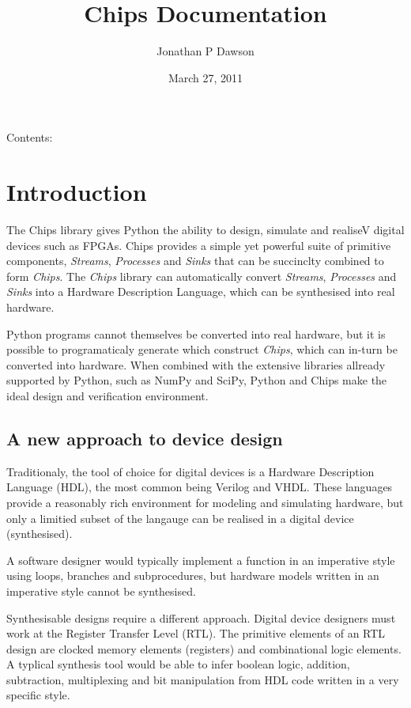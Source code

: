 \documentclass[letterpaper,10pt,english]{manual}
\title{Chips Documentation}
\date{March 27, 2011}
\author{Jonathan P Dawson}
\begin{document}
\maketitle
\tableofcontents
\hypertarget{--doc-index}{}


Contents:

\resetcurrentobjects
\hypertarget{--doc-introduction/index}{}

\chapter{Introduction}

The Chips library gives Python the ability to design, simulate and realiseV
digital devices such as FPGAs. Chips provides a simple yet powerful suite of
primitive components, \emph{Streams}, \emph{Processes} and \emph{Sinks} that can be succinclty
combined to form \emph{Chips}. The \emph{Chips} library can automatically convert
\emph{Streams}, \emph{Processes} and \emph{Sinks} into a Hardware Description Language, which
can be synthesised into real hardware.

Python programs cannot themselves be converted into real hardware, but it is
possible to programaticaly generate which construct \emph{Chips}, which can in-turn
be converted into hardware. When combined with the extensive libraries allready
supported by Python, such as NumPy and SciPy, Python and Chips make the ideal
design and verification environment.


\section{A new approach to device design}

Traditionaly, the tool of choice for digital devices is a Hardware Description
Language (HDL), the most common being Verilog and VHDL. These languages provide
a reasonably rich environment for modeling and simulating hardware, but only a
limitied subset of the langauge can be realised in a digital device
(synthesised).

A software designer would typically implement a function in an imperative style
using loops, branches and subprocedures, but hardware models written in an
imperative style cannot be synthesised.

Synthesisable designs require a different approach. Digital device designers
must work at the Register Transfer Level (RTL). The primitive elements of an
RTL design are clocked memory elements (registers) and combinational logic
elements. A typlical synthesis tool would be able to infer boolean logic,
addition, subtraction, multiplexing and bit manipulation from HDL code written
in a very specific style.
\end{document}
